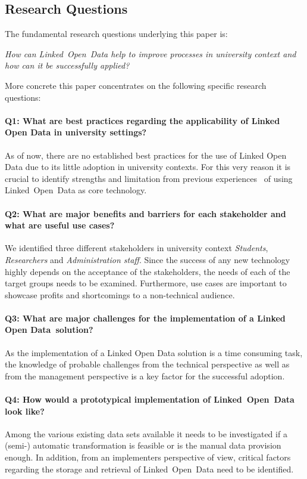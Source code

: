 \documentclass{article}
\begin{document}
\subsection{Research Questions}
\label{introduction:research-questions}
The fundamental research questions underlying this paper is:
\begin{displayquote}
\textit{How can Linked~Open~Data help to improve processes in university context and how can it be successfully applied?}
\end{displayquote}
More concrete this paper concentrates on the following specific research questions:
\paragraph{Q1: What are best practices regarding the applicability of Linked Open Data in university settings?}
As of now, there are no established best practices for the use of Linked Open Data due to its little adoption in university contexts. For this very reason it is crucial to identify strengths and limitation from previous experiences~\cite{url:linked-universities-members} of using Linked~Open~Data as core technology. 
\paragraph{Q2: What are major benefits and barriers for each stakeholder and what are useful use cases?}
We identified three different stakeholders in university context \textit{Students}, \textit{Researchers} and \textit{Administration staff}. Since the success of any new technology highly depends on the acceptance of the stakeholders, the needs of each of the target groups needs to be examined. Furthermore, use cases are important to showcase profits and shortcomings to a non-technical audience. 
\paragraph{Q3: What are major challenges for the implementation of a Linked Open Data~solution?}
As the implementation of a Linked Open Data solution is a time consuming task, the knowledge of probable challenges from the technical perspective as well as from the management perspective is a key factor for the successful adoption. 
\paragraph{Q4: How would a prototypical implementation of Linked~Open~Data look like?}
Among the various existing data sets available it needs to be investigated if a (semi-) automatic transformation is feasible or is the manual data provision enough. In addition, from an implementers perspective of view, critical factors regarding the storage and retrieval of Linked~Open~Data need to be identified. 
\end{document}

